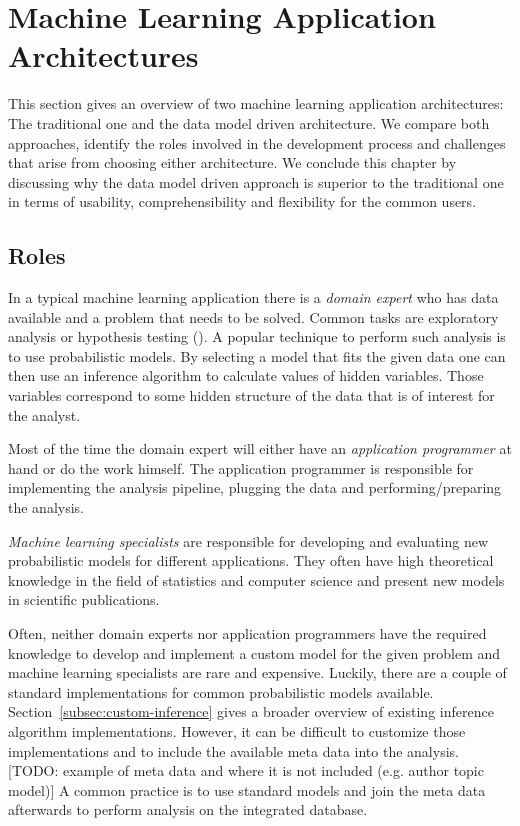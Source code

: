 \section{Machine Learning Application Architectures}

This section gives an overview of two machine learning application architectures: The traditional one and the data model driven architecture. We compare both approaches, identify the roles involved in the development process and challenges that arise from choosing either architecture. We conclude this chapter by discussing why the data model driven approach is superior to the traditional one in terms of usability, comprehensibility and flexibility for the common users.

\subsection{Roles}

In a typical machine learning application there is a \emph{domain expert} who has data available and a problem that needs to be solved. Common tasks are exploratory analysis or hypothesis testing (\cite{tukey1980we}). A popular technique to perform such analysis is to use probabilistic models. By selecting a model that fits the given data one can then use an inference algorithm to calculate values of hidden variables. Those variables correspond to some hidden structure of the data that is of interest for the analyst.

Most of the time the domain expert will either have an \emph{application programmer} at hand or do the work himself. The application programmer is responsible for implementing the analysis pipeline, plugging the data and performing/preparing the analysis.

\emph{Machine learning specialists} are responsible for developing and evaluating new probabilistic models for different applications. They often have high theoretical knowledge in the field of statistics and computer science and present new models in scientific publications.

Often, neither domain experts nor application programmers have the required knowledge to develop and implement a custom model for the given problem and machine learning specialists are rare and expensive. Luckily, there are a couple of standard implementations for common probabilistic models available. Section~\ref{subsec:custom-inference} gives a broader overview of existing inference algorithm implementations. However, it can be difficult to customize those implementations and to include the available meta data into the analysis. [TODO: example of meta data and where it is not included (e.g. author topic model)] A common practice is to use standard models and join the meta data afterwards to perform analysis on the integrated database.

